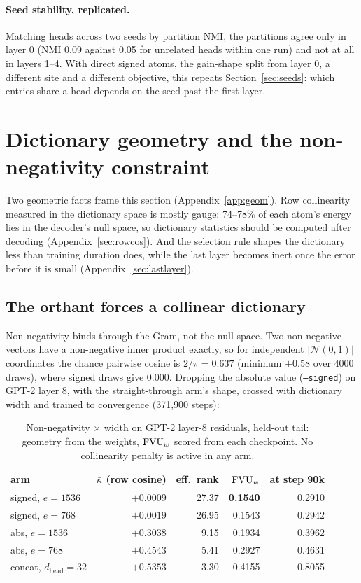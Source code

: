 \paragraph{Seed stability, replicated.} Matching heads across two seeds by
partition NMI, the partitions agree only in layer 0 (NMI 0.09 against
0.05 for unrelated heads within one run) and not at all in layers 1--4.
With direct signed atoms, the gain-shape split from layer 0, a different
site and a different objective, this repeats Section~\ref{sec:seeds}:
which entries share a head depends on the seed past the first layer.

\section{Dictionary geometry and the non-negativity constraint}
\label{sec:geom}

Two geometric facts frame this section (Appendix~\ref{app:geom}). Row
collinearity measured in the dictionary space is mostly gauge: 74--78\% of
each atom's energy lies in the decoder's null space, so dictionary
statistics should be computed after decoding (Appendix~\ref{sec:rowcos}).
And the selection rule shapes the dictionary less than training duration
does, while the last layer becomes inert once the error before it is
small (Appendix~\ref{sec:lastlayer}).

\subsection{The orthant forces a collinear dictionary}
\label{sec:gpt2}

Non-negativity binds through the Gram, not the null space. Two
non-negative vectors have a non-negative inner product exactly, so for
independent $\lvert\mathcal{N}(0,1)\rvert$ coordinates the chance pairwise
cosine is $2/\pi = 0.637$ (minimum $+0.58$ over 4000 draws), where signed
draws give 0.000. Dropping the absolute value (\texttt{--signed}) on GPT-2
layer 8, with the straight-through arm's shape, crossed with dictionary
width and trained to convergence (371{,}900 steps):

\begin{table}[htbp]\centering\small
\begin{tabular}{@{}lrrrr@{}}
\toprule
arm & $\bar\kappa$ (row cosine) & eff.\ rank & $\mathrm{FVU}_w$ & at step 90k \\
\midrule
signed, $e{=}1536$ & $+0.0009$ & 27.37 & \textbf{0.1540} & 0.2910 \\
signed, $e{=}768$  & $+0.0019$ & 26.95 & 0.1543 & 0.2942 \\
abs, $e{=}1536$    & $+0.3038$ &  9.15 & 0.1934 & 0.3962 \\
abs, $e{=}768$     & $+0.4543$ &  5.41 & 0.2927 & 0.4631 \\
concat, $d_{\mathrm{head}}{=}32$ & $+0.5353$ & 3.30 & 0.4155 & 0.8055 \\
\bottomrule
\end{tabular}
\caption{Non-negativity $\times$ width on GPT-2 layer-8 residuals,
held-out tail: geometry from the weights, $\mathrm{FVU}_w$ scored from each
checkpoint. No collinearity penalty is active in any arm.}
\label{tab:orthant}
\end{table}


